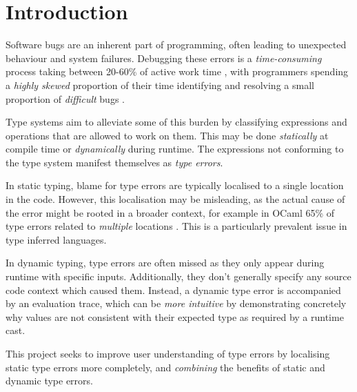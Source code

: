 \chapter{Introduction}
\label{chap:Introduction}
Software bugs are an inherent part of programming, often leading to unexpected behaviour and system failures. Debugging these errors is a \textit{time-consuming} process taking between 20-60\% of active work time \cite{DebugTimeSelfReport}, with programmers spending a \textit{highly skewed} proportion of their time identifying and resolving a small proportion of \textit{difficult} bugs \cite{DebugSkew}.

Type systems aim to alleviate some of this burden by classifying expressions and operations that are allowed to work on them. This may be done \textit{statically} at compile time or \textit{dynamically} during runtime. The expressions not conforming to the type system manifest themselves as \textit{type errors}.

In static typing, blame for type errors are typically localised to a single location in the code. However, this localisation may be misleading, as the actual cause of the error might be rooted in a broader context, for example in OCaml 65\% of type errors related to \textit{multiple} locations \cite{StudentTypeErrorFixes}. This is a particularly prevalent issue in type inferred languages.

In dynamic typing, type errors are often missed as they only appear during runtime with specific inputs.
Additionally, they don't generally specify any source code context which caused them. Instead, a dynamic type error is accompanied by an evaluation trace, which can be \textit{more intuitive} \cite{TraceVisualisation} by demonstrating concretely why values are not consistent with their expected type as required by a runtime cast.

This project seeks to improve user understanding of type errors by localising static type errors more completely, and \textit{combining} the benefits of static and dynamic type errors.

